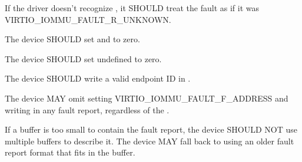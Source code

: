 If the driver doesn't recognize , it SHOULD treat the fault
as if it was VIRTIO_IOMMU_FAULT_R_UNKNOWN.


The device SHOULD set  and  to zero.

The device SHOULD set undefined  to zero.

The device SHOULD write a valid endpoint ID in .

The device MAY omit setting VIRTIO_IOMMU_FAULT_F_ADDRESS and writing
 in any fault report, regardless of the .

If a buffer is too small to contain the fault report\footnotemark, the
device SHOULD NOT use multiple buffers to describe it. The device MAY fall
back to using an older fault report format that fits in the buffer.


